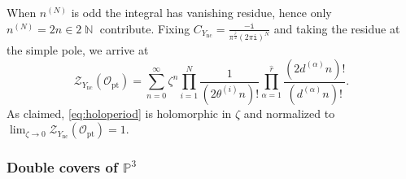 \documentclass[12pt,a4paper,oneside]{amsart}
\numberwithin{equation}{section}
\theoremstyle{definition}
\theoremstyle{remark}
\DeclareMathOperator{\N}{\mathbb{N}}
\newcommand{\mz}{\mathcal{Z}}
\newcommand{\Ync}{Y_{\mathrm{nc}}}
\newcommand{\ii}{\mathtt{i}}
\begin{document}
When $n^{(N)}$ is odd the integral has vanishing residue, hence only $n^{(N)}=2n \in 2 \N$ contribute. Fixing $C_{\Ync} = \frac{- \ii }{\pi^{\frac{\hat{r}}{2}} (2\pi \ii)^{N}}$ and taking the residue at the simple pole, we arrive at 
\begin{equation}
\label{eq:holoperiod}
     \mz_{\Ync} \left( \mathcal{O}_{\mathrm{pt}} \right) = \sum_{n=0}^{\infty} \zeta^{n}  \prod_{i=1}^{N}\frac{1}{\left(2\theta^{(i)} n \right)!}  \prod_{\alpha=1}^{\hat{r}} \frac{ \left( 2d^{(\alpha)} n \right)! }{\left( d^{(\alpha)} n \right)!} .
\end{equation}
As claimed, \eqref{eq:holoperiod} is holomorphic in $\zeta$ and normalized to $\lim_{\zeta \to 0} \mz_{\Ync} \left( \mathcal{O}_{\mathrm{pt}} \right) =1$.







\subsubsection{Double covers of \texorpdfstring{$\mathbb{P}^3$}{P3}}
\end{document}

